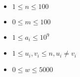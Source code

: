\begin{itemize}
\tightlist
\item $1\leq n \leq 100$
\item $0\leq m \leq 100$
\item $1\leq a_i \leq 10^9$
\item $1\leq u_i,v_i \leq n, u_i\neq v_i$
\item $0\leq w \leq 5000$
\end{itemize}
